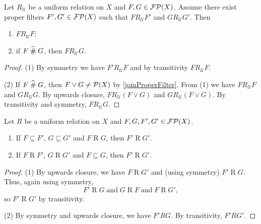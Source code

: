 \begin{lemma} \label{uniformRelationRelatedElementLemma}
Let $R_\mathcal{U}$ be a uniform relation on $X$ and $F,G\in\operatorname{\mathcal{FP}}(X)$. Assume there exist proper filters $F',G'\in\operatorname{\mathcal{FP}}(X)$ such that $F\mathrel{R_\mathcal{U}} F'$ and $G\mathrel{R_\mathcal{U}}G'$. Then
\begin{enumerate}
\item $F\mathrel{R_\mathcal{U}} F$;
\item if $F\mathrel{\widehat{\#}} G$, then $F\mathrel{R_\mathcal{U}} G$.
\end{enumerate}
\end{lemma}
\begin{proof}
(1) By symmetry we have $F'\mathrel{R_\mathcal{U}} F$ and by transitivity $F\mathrel{R_\mathcal{U}} F$.

(2) If $F\mathrel{\widehat{\#}} G$, then $F\vee G \neq \operatorname{\mathcal{P}}(X)$ by \ref{joinProperFilter}. From (1) we have $F\mathrel{R_\mathcal{U}} F$ and $G\mathrel{R_\mathcal{U}} G$. By upwards closure, $F\mathrel{R_\mathcal{U}} (F\vee G)$ and $G\mathrel{R_\mathcal{U}} (F\vee G)$. By transitivity and symmetry, $F\mathrel{R_\mathcal{U}} G$.
\end{proof}

\begin{lemma} \label{uniformRelationUpwardsClosure}
Let $R$ be a uniform relation on $X$ and $F,G, F', G'\in\operatorname{\mathcal{FP}}(X)$.
\begin{enumerate}
\item If $F \subseteq F'$, $G\subseteq G'$ and $F\mathrel{R} G$, then $F'\mathrel{R} G'$.
\item If $F \mathrel{R} F'$, $G\mathrel{R} G'$ and $F\subseteq G$, then $F'\mathrel{R} G'$.
\end{enumerate}
\end{lemma}
\begin{proof}
(1) By upwards closure, we have $F\mathrel{R} G'$ and  (using symmetry) $F'\mathrel{R} G$. Thus, again using symmetry,
\[ F'\mathrel{R} G \;\text{and}\; G \mathrel{R} F \;\text{and}\; F \mathrel{R} G', \]
so $F'\mathrel{R} G'$ by transitivity.

(2) By symmetry and upwards closure, we have $F'RG$. By transitivity, $F'RG'$.
\end{proof}

